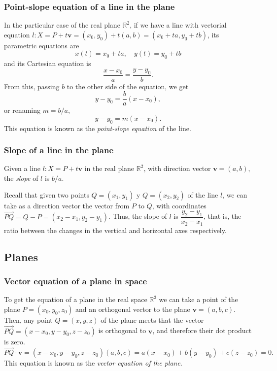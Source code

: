 \begin{frame}
\frametitle{Point-slope equation of a line in the plane}
In the particular case of the real plane $\mathbb{R}^2$, if we have a line with vectorial equation $l: X=P+t\mathbf{v}=(x_0,y_0)+t(a,b)
= (x_0+ta,y_0+tb)$, its parametric equations are
\[
x(t)=x_0+ta,\quad y(t)=y_0+tb
\]
and its Cartesian equation is
\[
\frac{x-x_0}{a} = \frac{y-y_0}{b}.
\]
From this, passing $b$ to the other side of the equation, we get 
\[
y-y_0 = \frac{b}{a}(x-x_0),
\]
or renaming $m=b/a$,
\[
y-y_0=m(x-x_0).
\]
This equation is known as the \emph{point-slope equation} of the line.
\end{frame}


\begin{frame}
\frametitle{Slope of a line in the plane}
\begin{definition}
Given a line $l: X=P+t\mathbf{v}$ in the real plane $\mathbb{R}^2$, with direction vector $\mathbf{v}=(a,b)$, the \emph{slope} of $l$ is $b/a$.
\end{definition}

Recall that given two points $Q=(x_1,y_1)$ y $Q=(x_2,y_2)$ of the line $l$, we can take as a direction vector the vector from $P$ to $Q$, with coordinates $\vec{PQ}=Q-P=(x_2-x_1,y_2-y_1)$. 
Thus, the slope of $l$ is $\dfrac{y_2-y_1}{x_2-x_1}$, that is, the ratio between the changes in the vertical and horizontal axes respectively.
\begin{center}

\end{center}
\end{frame}



\subsection{Planes}
\begin{frame}
\frametitle{Vector equation of a plane in space}
To get the equation of a plane in the real space $\mathbb{R}^3$ we can take a point of the plane $P=(x_0,y_0,z_0)$ and an orthogonal vector to the plane $\mathbf{v}=(a,b,c)$.
Then, any point $Q=(x,y,z)$ of the plane meets that the vector $\vec{PQ} = (x-x_0,y-y_0,z-z_0)$ is orthogonal to $\mathbf{v}$, and therefore their dot product is zero. 
\[
\vec{PQ}\cdot\mathbf{v} = (x-x_0,y-y_0,z-z_0)(a,b,c) = a(x-x_0)+b(y-y_0)+c(z-z_0) = 0.
\]
This equation is known as the \emph{vector equation of the plane}.

\begin{center}

\end{center}
\end{frame}


